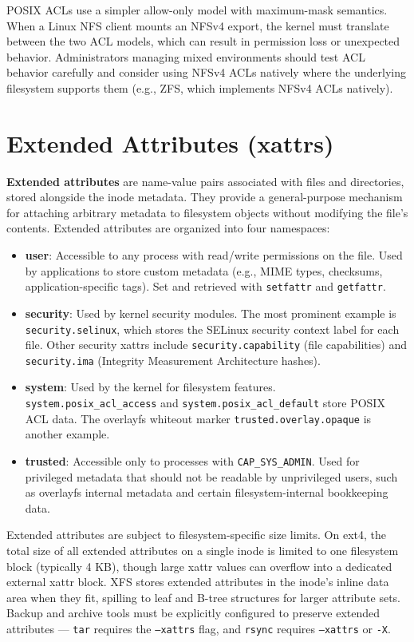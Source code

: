 POSIX ACLs use a simpler allow-only model with maximum-mask semantics. When a Linux NFS client mounts an NFSv4 export, the kernel must translate between the two ACL models, which can result in permission loss or unexpected behavior. Administrators managing mixed environments should test ACL behavior carefully and consider using NFSv4 ACLs natively where the underlying filesystem supports them (e.g., ZFS, which implements NFSv4 ACLs natively).

\section{Extended Attributes (xattrs)}

\textbf{Extended attributes} are name-value pairs associated with files and directories, stored alongside the inode metadata. They provide a general-purpose mechanism for attaching arbitrary metadata to filesystem objects without modifying the file's contents. Extended attributes are organized into four namespaces:

\begin{itemize}
  \item \textbf{user}: Accessible to any process with read/write permissions on the file. Used by applications to store custom metadata (e.g., MIME types, checksums, application-specific tags). Set and retrieved with \texttt{setfattr} and \texttt{getfattr}.
  \item \textbf{security}: Used by kernel security modules. The most prominent example is \texttt{security.selinux}, which stores the SELinux security context label for each file. Other security xattrs include \texttt{security.capability} (file capabilities) and \texttt{security.ima} (Integrity Measurement Architecture hashes).
  \item \textbf{system}: Used by the kernel for filesystem features. \texttt{system.posix\_acl\_access} and \texttt{system.posix\_acl\_default} store POSIX ACL data. The overlayfs whiteout marker \texttt{trusted.overlay.opaque} is another example.
  \item \textbf{trusted}: Accessible only to processes with \texttt{CAP\_SYS\_ADMIN}. Used for privileged metadata that should not be readable by unprivileged users, such as overlayfs internal metadata and certain filesystem-internal bookkeeping data.
\end{itemize}

Extended attributes are subject to filesystem-specific size limits. On ext4, the total size of all extended attributes on a single inode is limited to one filesystem block (typically 4 KB), though large xattr values can overflow into a dedicated external xattr block. XFS stores extended attributes in the inode's inline data area when they fit, spilling to leaf and B-tree structures for larger attribute sets. Backup and archive tools must be explicitly configured to preserve extended attributes --- \texttt{tar} requires the \texttt{--xattrs} flag, and \texttt{rsync} requires \texttt{--xattrs} or \texttt{-X}.

